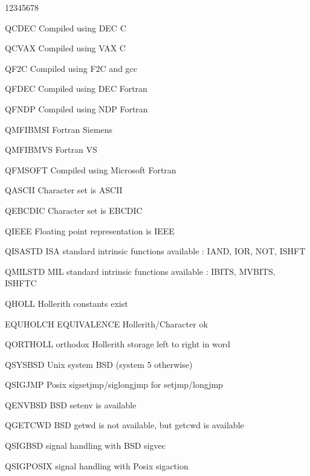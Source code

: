\begin{DLtt}{12345678}
\item[QCDEC]     Compiled using DEC C
\item[QCVAX]     Compiled using VAX C\\

\item[QF2C]      Compiled using F2C and gcc
\item[QFDEC]     Compiled using DEC Fortran
\item[QFNDP]     Compiled using NDP Fortran
\item[QMFIBMSI]  Fortran Siemens 
\item[QMFIBMVS]  Fortran VS 
\item[QFMSOFT]   Compiled using Microsoft Fortran\\

\item[QASCII]    Character set is ASCII
\item[QEBCDIC]   Character set is EBCDIC\\

\item[QIEEE]     Floating point representation is IEEE\\

\item[QISASTD]   ISA standard intrinsic functions available :
                 IAND, IOR, NOT, ISHFT
\item[QMILSTD]   MIL standard intrinsic functions available :
                 IBITS, MVBITS, ISHFTC\\

\item[QHOLL]     Hollerith constants exist
\item[EQUHOLCH]  EQUIVALENCE Hollerith/Character ok
\item[QORTHOLL]  orthodox Hollerith storage left to right in word\\

\item[QSYSBSD]   Unix system BSD (system 5 otherwise)
\item[QSIGJMP]   Posix sigsetjmp/siglongjmp for setjmp/longjmp
\item[QENVBSD]   BSD setenv is available
\item[QGETCWD]   BSD getwd is not available, but getcwd is available
\item[QSIGBSD]   signal handling with BSD   sigvec
\item[QSIGPOSIX] signal handling with Posix sigaction\\


\end{DLtt}

